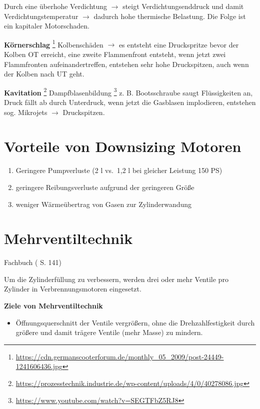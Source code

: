 Durch eine überhohe Verdichtung $\to$ steigt Verdichtungsenddruck und
damit Verdichtungstemperatur $\to$ dadurch hohe thermische Belastung.
Die Folge ist ein kapitaler Motorschaden.

\textbf{Körnerschlag} \footnote{\url{https://cdn.germanscooterforum.de/monthly_05_2009/post-24449-1241606436.jpg}}
Kolbenschäden $\to$ es entsteht eine Druckspritze bevor der Kolben OT
erreicht, eine zweite Flammenfront entsteht, wenn jetzt zwei
Flammfronten aufeinandertreffen, entstehen sehr hohe Druckspitzen, auch
wenn der Kolben nach UT geht.

\textbf{Kavitation} \footnote{\url{https://prozesstechnik.industrie.de/wp-content/uploads/4/0/40278086.jpg}}
Dampfblasenbildung \footnote{\url{https://www.youtube.com/watch?v=SEGTFbZ5RJ8}}
z. B. Bootsschraube saugt Flüssigkeiten an, Druck fällt ab durch
Unterdruck, wenn jetzt die Gasblasen implodieren, entstehen sog.
Mikrojets $\to$ Druckspitzen.

\section{Vorteile von Downsizing
Motoren}\label{vorteile-von-downsizing-motoren}

\begin{enumerate}
\item
  Geringere Pumpverluste (2 l vs.~1,2 l bei gleicher Leistung 150 PS)
\item
  geringere Reibungsverluste aufgrund der geringeren Größe
\item
  weniger Wärmeübertrag von Gasen zur Zylinderwandung
\end{enumerate}

\section{Mehrventiltechnik}\label{mehrventiltechnik}

Fachbuch (\textcite{respondeck:2019:servicetechniker} S. 141)

Um die Zylinderfüllung zu verbessern, werden drei oder mehr Ventile pro
Zylinder in Verbrennungsmotoren eingesetzt.

\textbf{Ziele von Mehrventiltechnik}

\begin{itemize}
\item
  Öffnungsquerschnitt der Ventile vergrößern, ohne die
  Drehzahlfestigkeit durch größere und damit trägere Ventile (mehr
  Masse) zu mindern.
\end{itemize}

